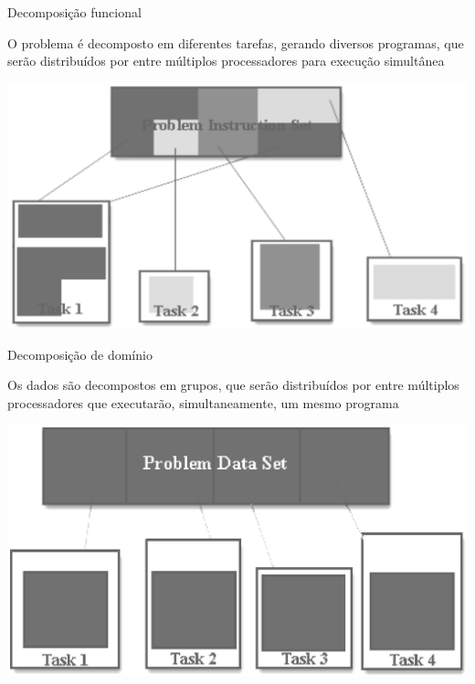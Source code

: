 \documentclass[compress]{beamer}
\begin{document}

\begin{frame}{Decomposição funcional}

O problema é decomposto em diferentes tarefas, gerando diversos programas, que serão  distribuídos por entre múltiplos processadores para execução simultânea


\centering\includegraphics[width=\textwidth]{images/decomposicao_funcional.png}

\end{frame}


\begin{frame}{Decomposição de domínio}

Os dados são decompostos em grupos, que serão distribuídos por entre múltiplos 
processadores que executarão, simultaneamente, um mesmo programa

\centering\includegraphics[width=\textwidth]{images/decomposicao_dados.png}

\end{frame}
\end{document}

